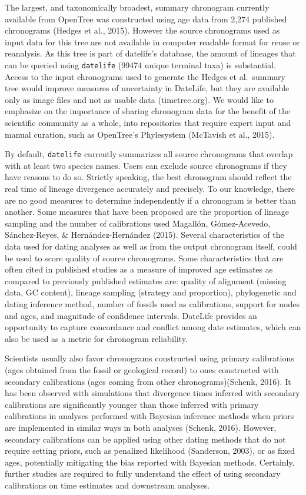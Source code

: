 \documentclass[
  english,
  man]{apa6}
\begin{document}
The largest, and taxonomically broadest, summary chronogram currently available from OpenTree
was constructed using age data from 2,274 published chronograms (Hedges et al., 2015). However the source chronograms used as input data for this tree are not available in computer readable format for reuse or reanalysis. As this tree is part of datelife's database, the amount of lineages that can be queried using \texttt{datelife} (99474 unique terminal taxa) is substantial.
Access to the input chronograms used to generate the Hedges et al.~summary tree would improve measures of uncertainty in DateLife, but they are available only as image files and not as usable data (timetree.org).
We would like to emphasize on the importance of sharing chronogram data for the benefit of the scientific community as a whole, into repositories that require expert input and manual curation, such as OpenTree's Phylesystem (McTavish et al., 2015).

By default, \texttt{datelife} currently summarizes all source chronograms that overlap with at least two species names. Users can exclude source chronograms if they have reasons to do so.
Strictly speaking, the best chronogram should reflect the real time of lineage divergence accurately and precisely.
To our knowledge, there are no good measures to determine independently if a chronogram is better than another.
Some measures that have been proposed are the proportion of lineage sampling and the number of calibrations used Magallón, Gómez-Acevedo, Sánchez-Reyes, \& Hernández-Hernández (2015).
Several characteristics of the data used for dating analyses as well as from the output chronogram itself, could be used to score quality of source chronograms.
Some characteristics that are often cited in published studies as a measure of improved age estimates as compared to previously published estimates are: quality of alignment (missing data, GC content), lineage sampling (strategy and proportion), phylogenetic and dating inference method, number of fossils used as calibrations, support for nodes and ages, and magnitude of confidence intervals.
DateLife provides an opportunity to capture concordance and conflict among date estimates, which can also be used as a metric for chronogram reliability.

Scientists usually also favor chronograms constructed using primary calibrations (ages obtained from the fossil or geological record) to ones constructed with secondary calibrations (ages coming from other chronograms)(Schenk, 2016). It has been observed with simulations that divergence times inferred with secondary calibrations are significantly younger than those inferred with primary calibrations in analyses performed with Bayesian inference methods when priors are implemented in similar ways in both analyses (Schenk, 2016). However, secondary calibrations
can be applied using other dating methods that do not require setting priors, such as penalized likelihood (Sanderson, 2003), or as fixed ages,
potentially mitigating the bias reported with Bayesian methods.
Certainly, further studies are required to fully understand the effect of using secondary calibrations on time estimates and downstream analyses.
\end{document}
